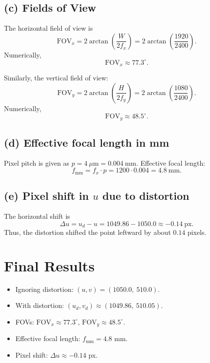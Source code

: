 \documentclass[12pt,a4paper]{article}
\begin{document}
\subsection*{(c) Fields of View}

The horizontal field of view is
\[
\mathrm{FOV}_x = 2 \arctan\!\left(\frac{W}{2f_x}\right)
= 2 \arctan\!\left(\frac{1920}{2400}\right).
\]
Numerically,
\[
\mathrm{FOV}_x \approx 77.3^\circ.
\]

Similarly, the vertical field of view:
\[
\mathrm{FOV}_y = 2 \arctan\!\left(\frac{H}{2f_y}\right)
= 2 \arctan\!\left(\frac{1080}{2400}\right).
\]
Numerically,
\[
\mathrm{FOV}_y \approx 48.5^\circ.
\]

\subsection*{(d) Effective focal length in mm}

Pixel pitch is given as $p=4~\mu\mathrm{m} = 0.004~\mathrm{mm}$.  
Effective focal length:
\[
f_{\mathrm{mm}} = f_x \cdot p = 1200 \cdot 0.004 = 4.8~\mathrm{mm}.
\]

\subsection*{(e) Pixel shift in $u$ due to distortion}

The horizontal shift is
\[
\Delta u = u_d - u = 1049.86 - 1050.0 \approx -0.14\ \text{px}.
\]
Thus, the distortion shifted the point leftward by about $0.14$ pixels.

\section*{Final Results}
\begin{itemize}
\item Ignoring distortion: $(u,v)=(1050.0,\ 510.0)$.
\item With distortion: $(u_d,v_d)\approx(1049.86,\ 510.05)$.
\item FOVs: $\mathrm{FOV}_x\approx 77.3^\circ$, $\mathrm{FOV}_y\approx 48.5^\circ$.
\item Effective focal length: $f_{\mathrm{mm}}=4.8$ mm.
\item Pixel shift: $\Delta u \approx -0.14$ px.
\end{itemize}


\end{document}
